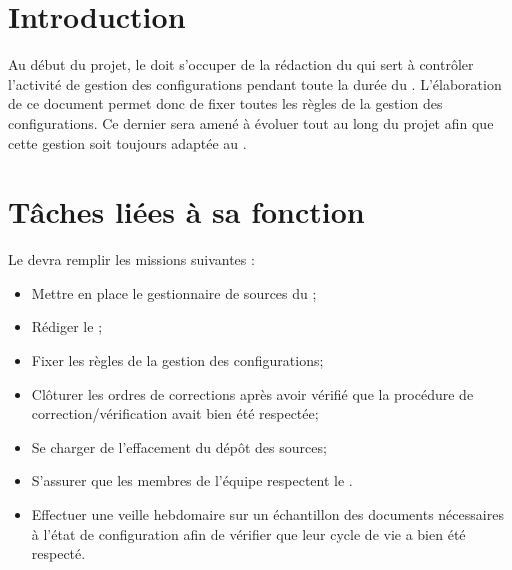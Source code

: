 \documentclass[11pt]{article}
\begin{document}
\section*{Introduction}

Au début du projet, le \RGC{} doit s'occuper de la rédaction du \PGCCourt{} qui sert à contrôler l’activité de gestion des configurations pendant toute la durée du \PICCourt. L’élaboration de ce document permet donc de fixer toutes les règles de la gestion des configurations. Ce dernier sera amené à évoluer tout au long du projet afin que cette gestion soit toujours adaptée au \PICCourt.

\section*{Tâches liées à sa fonction}

Le \RGC{} devra remplir les missions suivantes :
\begin{itemize}
	\item Mettre en place le gestionnaire de sources du \PICCourt;
	\item Rédiger le \PGC;
	\item Fixer les règles de la gestion des configurations;
        \item Clôturer les ordres de corrections après avoir vérifié que la procédure de correction/vérification avait bien été respectée;
        \item Se charger de l'effacement du dépôt des sources;
        \item S'assurer que les membres de l'équipe \PICCourt{} respectent le \PGCCourt.
	\item Effectuer une veille hebdomaire sur un échantillon des documents nécessaires à l'état de configuration afin de vérifier que leur cycle de vie a bien été respecté.
\end{itemize}
\end{document}
